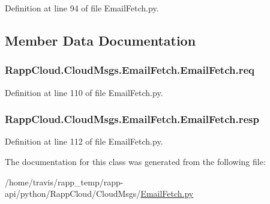 Definition at line 94 of file Email\-Fetch.\-py.



\subsection{Member Data Documentation}
\hypertarget{classRappCloud_1_1CloudMsgs_1_1EmailFetch_1_1EmailFetch_a9fa3be9b3fc247e5b491444afefb6d57}{
\subsubsection[{req}]{\setlength{\rightskip}{0pt plus 5cm}Rapp\-Cloud.\-Cloud\-Msgs.\-Email\-Fetch.\-Email\-Fetch.\-req}}\label{classRappCloud_1_1CloudMsgs_1_1EmailFetch_1_1EmailFetch_a9fa3be9b3fc247e5b491444afefb6d57}


Definition at line 110 of file Email\-Fetch.\-py.

\hypertarget{classRappCloud_1_1CloudMsgs_1_1EmailFetch_1_1EmailFetch_af2a52f89e0c5c915b052b2766023fbe4}{
\subsubsection[{resp}]{\setlength{\rightskip}{0pt plus 5cm}Rapp\-Cloud.\-Cloud\-Msgs.\-Email\-Fetch.\-Email\-Fetch.\-resp}}\label{classRappCloud_1_1CloudMsgs_1_1EmailFetch_1_1EmailFetch_af2a52f89e0c5c915b052b2766023fbe4}


Definition at line 112 of file Email\-Fetch.\-py.



The documentation for this class was generated from the following file\-:\begin{DoxyCompactItemize}
\item 
/home/travis/rapp\-\_\-temp/rapp-\/api/python/\-Rapp\-Cloud/\-Cloud\-Msgs/\hyperlink{EmailFetch_8py}{Email\-Fetch.\-py}\end{DoxyCompactItemize}

